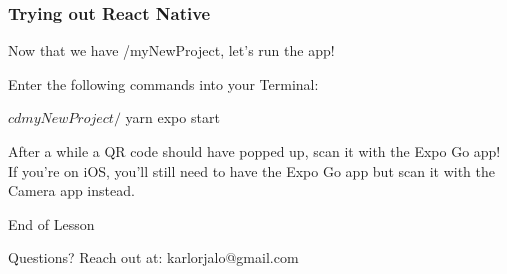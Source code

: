 \documentclass{beamer}
\begin{document}
  \begin{frame}[fragile]
    \frametitle{Trying out React Native}

    Now that we have /myNewProject, let's run the app!

    Enter the following commands into your Terminal:
    \newline
    \begin{bashcode}
$ cd myNewProject/
$ yarn expo start
    \end{bashcode}
    \vspace{0.5cm}
    After a while a QR code should have popped up, scan it with the Expo Go app!
    If you're on iOS, you'll still need to have the Expo Go app but scan it with the Camera app instead.
  \end{frame}
  
  \appendix

  \begin{frame}[standout]
    End of Lesson

    {\small Questions? Reach out at:}
    {\footnotesize karlorjalo@gmail.com}
  \end{frame}
\end{document}
